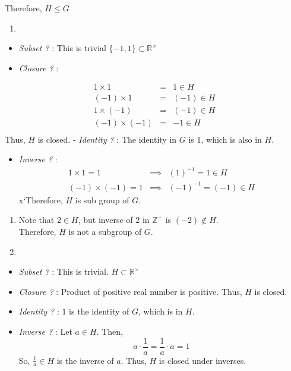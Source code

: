 \documentclass[
]{book}
\providecommand{\tightlist}{%
  \setlength{\itemsep}{0pt}\setlength{\parskip}{0pt}}
\theoremstyle{definition}
\theoremstyle{definition}
\theoremstyle{definition}
\theoremstyle{definition}
\theoremstyle{remark}
\begin{document}
Therefore, \(H \leq G\)

\begin{enumerate}
\def\labelenumi{(\alph{enumi})}
\setcounter{enumi}{1}
\tightlist
\item
\end{enumerate}

\begin{itemize}
\item
  \emph{Subset ?} : This is trivial \(\{-1,1\}\subset \mathbb{R}^\times\)
\item
  \emph{Closure ?} :
\end{itemize}

\begin{eqnarray}
1 \times 1 &=& 1\in H\\
(-1) \times 1 &=& (-1)\in H\\
1 \times (-1) &=& (-1)\in H\\
(-1) \times (-1) &=& -1\in H\\
\end{eqnarray}
Thus, \(H\) is closed.
- \emph{Identity ?} : The identity in \(G\) is \(1\), which is also in \(H\).

\begin{itemize}
\tightlist
\item
  \emph{Inverse ?} :
  \begin{eqnarray}
  1 \times 1 = 1   &\implies & (1)^{-1}=1\in H\\
  (-1) \times (-1) = 1 &\implies & (-1)^{-1}=(-1)\in H
  \end{eqnarray}
  x`Therefore, \(H\) is sub group of \(G\).
\end{itemize}

\begin{enumerate}
\def\labelenumi{(\alph{enumi})}
\setcounter{enumi}{2}
\item
  Note that \(2\in H\), but inverse of \(2\) in \(\mathbb{Z}^+\) is \((-2) \not \in H\).\\
  Therefore, \(H\) is not a subgroup of \(G\).
\item
\end{enumerate}

\begin{itemize}
\item
  \emph{Subset ?} : This is trivial. \(H \subset \mathbb{R}^\times\)
\item
  \emph{Closure ?} : Product of positive real number is positive. Thus, \(H\) is closed.
\item
  \emph{Identity ?} : \(1\) is the identity of \(G\), which is in \(H\).
\item
  \emph{Inverse ?} : Let \(a\in H\). Then,
  \[a\cdot \frac{1}{a}=\frac{1}{a}\cdot a=1\]
  So, \(\frac{1}{a}\in H\) is the inverse of \(a\). Thus, \(H\) is closed under inverses.
\end{itemize}
\end{document}
